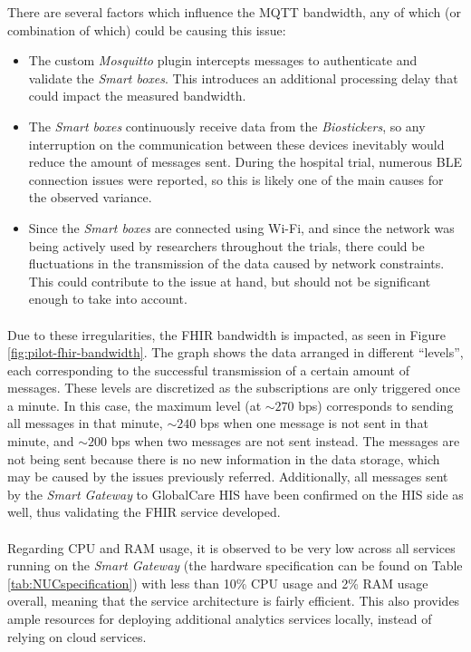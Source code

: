 There are several factors which influence the \acs{MQTT} bandwidth, any of which (or combination of which) could be causing this issue:

\begin{itemize}
    \item The custom \textit{Mosquitto} plugin intercepts messages to authenticate and validate the \textit{Smart boxes}. This introduces an additional processing delay that could impact the measured bandwidth.
    \item The \textit{Smart boxes} continuously receive data from the \textit{Biostickers}, so any interruption on the communication between these devices inevitably would reduce the amount of messages sent. During the hospital trial, numerous \acs{BLE} connection issues were reported, so this is likely one of the main causes for the observed variance.
    \item Since the \textit{Smart boxes} are connected using Wi-Fi, and since the network was being actively used by researchers throughout the trials, there could be fluctuations in the transmission of the data caused by network constraints. This could contribute to the issue at hand, but should not be significant enough to take into account.
\end{itemize}

\paragraph{} Due to these irregularities, the \acs{FHIR} bandwidth is impacted, as seen in Figure \ref{fig:pilot-fhir-bandwidth}. The graph shows the data arranged in different ``levels'', each corresponding to the successful transmission of a certain amount of messages. These levels are discretized as the subscriptions are only triggered once a minute. In this case, the maximum level (at ${\sim}  270$ bps) corresponds to sending all messages in that minute, ${\sim}  240$ bps when one message is not sent in that minute, and ${\sim}  200$ bps when two messages are not sent instead. The messages are not being sent because there is no new information in the data storage, which may be caused by the issues previously referred. Additionally, all messages sent by the \textit{Smart Gateway} to GlobalCare \acs{HIS} have been confirmed on the \acs{HIS} side as well, thus validating the \acs{FHIR} service developed.  

\paragraph{} Regarding \acs{CPU} and \acs{RAM} usage, it is observed to be very low across all services running on the \textit{Smart Gateway} (the hardware specification can be found on Table \ref{tab:NUCspecification}) with less than 10\% \acs*{CPU} usage and 2\% \acs*{RAM} usage overall, meaning that the service architecture is fairly efficient. This also provides ample resources for deploying additional analytics services locally, instead of relying on cloud services.

